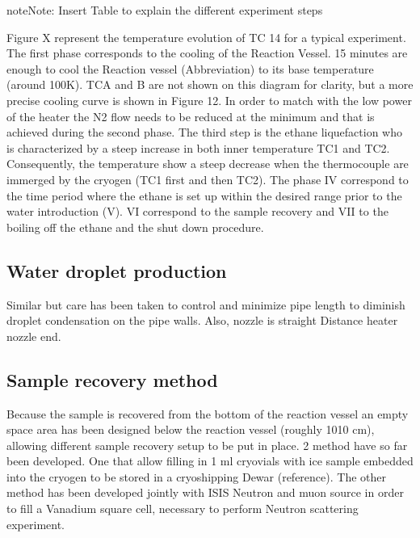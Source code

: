 \documentclass[letterpaper,10pt,english]{jupyterBook}
\begin{document}
\begin{sphinxadmonition}{note}{Note:}
\sphinxAtStartPar
Insert Table to explain the different experiment steps
\end{sphinxadmonition}

\sphinxAtStartPar
Figure X represent the temperature evolution of TC 1\sphinxhyphen{}4 for a typical experiment. The first phase corresponds to the cooling of the Reaction Vessel. 15 minutes are enough to cool the Reaction vessel (Abbreviation) to its base temperature (around 100K). TCA and B are not shown on this diagram for clarity, but a more precise cooling curve is shown in Figure 12. In order to match with the low power of the heater the N2 flow needs to be reduced at the minimum and that is achieved during the second phase. The third step is the ethane liquefaction who is characterized by a steep increase in both inner temperature TC1 and TC2. Consequently, the temperature show a steep decrease when the thermocouple are immerged by the cryogen (TC1 first and then TC2). The phase IV correspond to the time period where the ethane is set up within the desired range prior to the water introduction (V). VI correspond to the sample recovery and VII to the boiling off the ethane and the shut down procedure.


\subsection{Water droplet production}
\label{\detokenize{Chapter7/Chapter7:water-droplet-production}}
\sphinxAtStartPar
Similar but care has been taken to control and minimize pipe length to diminish droplet condensation on the pipe walls. Also, nozzle is straight
Distance heater \sphinxhyphen{} nozzle end.


\subsection{Sample recovery method}
\label{\detokenize{Chapter7/Chapter7:sample-recovery-method}}
\sphinxAtStartPar
Because the sample is recovered from the bottom of the reaction vessel an empty space area has been designed below the reaction vessel (roughly 1010 cm), allowing different sample recovery setup to be put in place. 2 method have so far been developed. One that allow filling in 1 ml cryo\sphinxhyphen{}vials with ice sample embedded into the cryogen to be stored in a cryoshipping Dewar (reference). The other method has been developed jointly with ISIS Neutron and muon source in order to fill a Vanadium square cell, necessary to perform Neutron scattering experiment.
\end{document}

